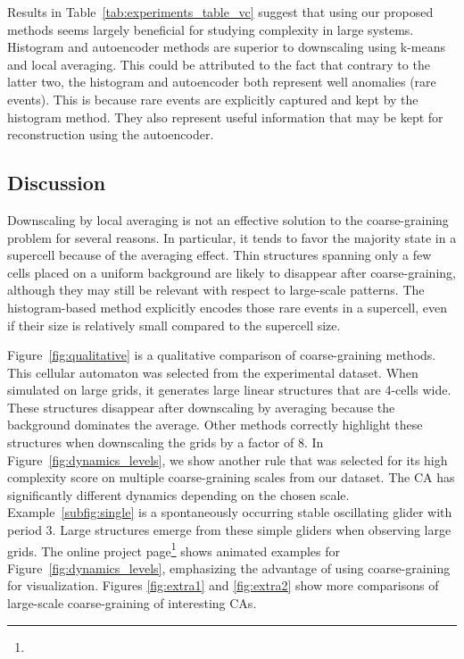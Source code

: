Results in Table~\ref{tab:experiments_table_vc} suggest that using our proposed methods
seems largely beneficial for studying complexity in large systems.
Histogram and autoencoder methods are superior to downscaling using k-means and
local averaging. This could be attributed to the fact that contrary to the
latter two, the histogram and autoencoder both represent well anomalies (rare
events). This is because rare events are explicitly captured and kept by the
histogram method. They also represent useful information that may be kept for
reconstruction using the autoencoder.

\subsection{Discussion}\label{sec:discussion}

Downscaling by local averaging is not an effective solution to the
coarse-graining problem for several reasons. In particular, it tends to favor
the majority state in a supercell because of the averaging effect. Thin
structures spanning only a few cells placed on a uniform background are likely to
disappear after coarse-graining, although they may still be relevant with respect
to large-scale patterns. The histogram-based method explicitly encodes those
rare events in a supercell, even if their size is relatively small compared
to the supercell size.

Figure~\ref{fig:qualitative} is a qualitative comparison of coarse-graining
methods. This cellular automaton was selected from the experimental dataset.
When simulated on large grids, it generates large linear structures that are
4-cells wide. These structures disappear after downscaling by averaging because
the background dominates the average. Other methods correctly highlight these
structures when downscaling the grids by a factor of 8. In
Figure~\ref{fig:dynamics_levels}, we show another rule that was selected for its
high complexity score on multiple coarse-graining scales from our dataset. The
CA has significantly different dynamics depending on the chosen scale.
Example~\ref{subfig:single} is a spontaneously occurring stable oscillating
glider with period 3. Large structures emerge from these simple gliders when
observing large grids. The online project page\footnote{\projecturl} shows
animated examples for Figure~\ref{fig:dynamics_levels}, emphasizing the advantage
of using coarse-graining for visualization. Figures \ref{fig:extra1} and \ref{fig:extra2} show more comparisons of large-scale coarse-graining of interesting \acp{CA}.

